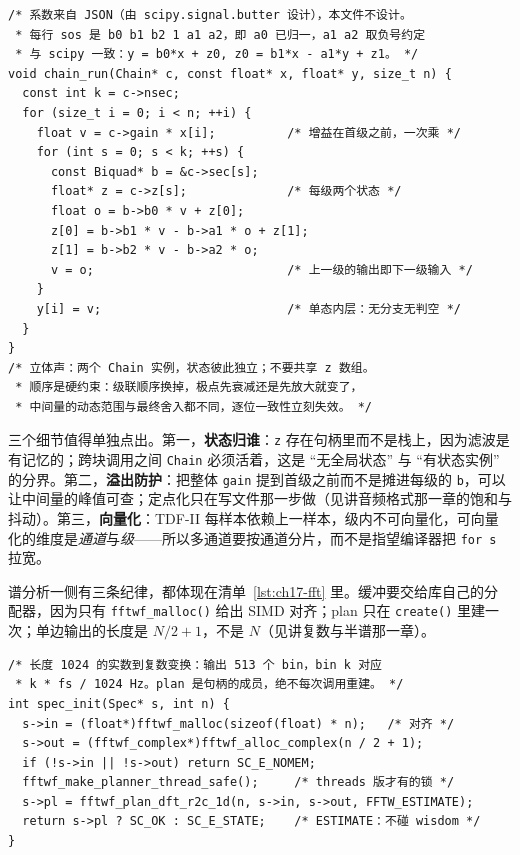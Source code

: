 \documentclass[12pt,a4paper,fontset=fandol]{ctexbook}
\newcommand{\Fn}[1]{\texttt{#1()}}
\newcommand{\Tp}[1]{\texttt{#1}}
\begin{document}
\begin{lstlisting}[style=cstyle,caption={core/biquad.c：TDF-II 级联的单声道状态更新},label={lst:ch17-biquad}]
/* 系数来自 JSON（由 scipy.signal.butter 设计），本文件不设计。
 * 每行 sos 是 b0 b1 b2 1 a1 a2，即 a0 已归一，a1 a2 取负号约定
 * 与 scipy 一致：y = b0*x + z0, z0 = b1*x - a1*y + z1。 */
void chain_run(Chain* c, const float* x, float* y, size_t n) {
  const int k = c->nsec;
  for (size_t i = 0; i < n; ++i) {
    float v = c->gain * x[i];          /* 增益在首级之前，一次乘 */
    for (int s = 0; s < k; ++s) {
      const Biquad* b = &c->sec[s];
      float* z = c->z[s];              /* 每级两个状态 */
      float o = b->b0 * v + z[0];
      z[0] = b->b1 * v - b->a1 * o + z[1];
      z[1] = b->b2 * v - b->a2 * o;
      v = o;                           /* 上一级的输出即下一级输入 */
    }
    y[i] = v;                          /* 单态内层：无分支无判空 */
  }
}
/* 立体声：两个 Chain 实例，状态彼此独立；不要共享 z 数组。
 * 顺序是硬约束：级联顺序换掉，极点先衰减还是先放大就变了，
 * 中间量的动态范围与最终舍入都不同，逐位一致性立刻失效。 */
\end{lstlisting}

三个细节值得单独点出。第一，\textbf{状态归谁}：\Tp{z} 存在句柄里而不是栈上，因为滤波是有记忆的；跨块调用之间 \Tp{Chain} 必须活着，这是 ``无全局状态'' 与 ``有状态实例'' 的分界。第二，\textbf{溢出防护}：把整体 \Tp{gain} 提到首级之前而不是摊进每级的 \Tp{b}，可以让中间量的峰值可查；定点化只在写文件那一步做（见讲音频格式那一章的饱和与抖动）。第三，\textbf{向量化}：TDF-II 每样本依赖上一样本，级内不可向量化，可向量化的维度是\emph{通道}与\emph{级}——所以多通道要按通道分片，而不是指望编译器把 \Tp{for s} 拉宽。

谱分析一侧有三条纪律，都体现在清单~\ref{lst:ch17-fft} 里。缓冲要交给库自己的分配器，因为只有 \Fn{fftwf\_malloc} 给出 SIMD 对齐；plan 只在 \Fn{create} 里建一次；单边输出的长度是 $N/2+1$，不是 $N$（见讲复数与半谱那一章）。

\begin{lstlisting}[style=cstyle,caption={dsp/spec.cpp：plan 复用、对齐缓冲与半谱长度},label={lst:ch17-fft}]
/* 长度 1024 的实数到复数变换：输出 513 个 bin，bin k 对应
 * k * fs / 1024 Hz。plan 是句柄的成员，绝不每次调用重建。 */
int spec_init(Spec* s, int n) {
  s->in = (float*)fftwf_malloc(sizeof(float) * n);   /* 对齐 */
  s->out = (fftwf_complex*)fftwf_alloc_complex(n / 2 + 1);
  if (!s->in || !s->out) return SC_E_NOMEM;
  fftwf_make_planner_thread_safe();     /* threads 版才有的锁 */
  s->pl = fftwf_plan_dft_r2c_1d(n, s->in, s->out, FFTW_ESTIMATE);
  return s->pl ? SC_OK : SC_E_STATE;    /* ESTIMATE：不碰 wisdom */
}
\end{lstlisting}
\end{document}
